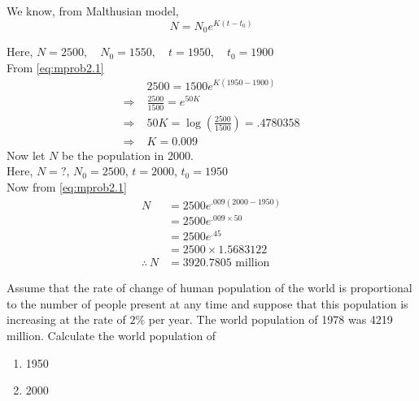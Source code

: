 \documentclass[../main-sheet.tex]{subfiles}
\begin{document}
\begin{soln}
    We know, from Malthusian model,
    \begin{equation}
        N=N_0 e^{K(t-t_0)} \label{eq:mprob2.1}
    \end{equation}
    
    
    Here, \(N=2500,\quad N_0=1550,\quad t=1950,\quad t_0=1900\)\\
    From \eqref{eq:mprob2.1}
    \begin{align*}
        &2500=1500 e^{K(1950-1900)}\\
        \Rightarrow\;&\frac{2500}{1500}= e^{50K}\\
        \Rightarrow\;&50K=\log\left( \frac{2500}{1500} \right)=.4780358\\
        \Rightarrow\;&K=0.009
    \end{align*}
    Now let \(N\) be the population in 2000.\\
    Here, \(N=?\), \(N_0=2500\), \(t=2000\), \(t_0=1950\)\\
    Now from \eqref{eq:mprob2.1}
    \begin{align*}
        N&=2500 e^{.009(2000-1950)}\\
        &=2500 e^{.009\times 50}\\
        &=2500 e^{.45}\\
        &=2500 \times 1.5683122\\
        \therefore\,N&=3920.7805 \text{ million}
    \end{align*}
\end{soln}
\begin{prob}
    Assume that the rate of change of human population of the world is proportional to the number of people present at any time and suppose that this population is increasing at the rate of \(2\%\) per year. The world population of 1978 was 4219 million. Calculate the world population of
    \begin{enumerate}[label=(\alph*)]
        \item 1950
        \item 2000
    \end{enumerate}
\end{prob}
\end{document}
